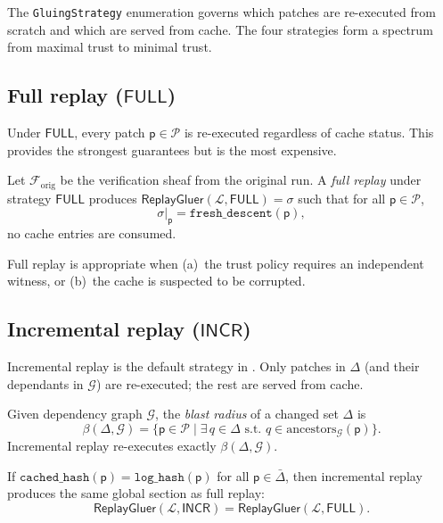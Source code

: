 \documentclass[11pt]{article}
\newcommand{\Gluer}{\mathsf{ReplayGluer}}
\newcommand{\TraceLog}{\mathcal{L}}
\newcommand{\Patch}{\mathsf{p}}
\newcommand{\PatchSet}{\mathcal{P}}
\newcommand{\GS}{\sigma}                   %
\newcommand{\ChangedSet}{\Delta}
\newcommand{\UnchangedSet}{\bar\Delta}
\newcommand{\DepGraph}{\mathcal{G}}
\newcommand{\BlastRadius}{\beta}
\newcommand{\StratFull}{\mathsf{FULL}}
\newcommand{\StratInc}{\mathsf{INCR}}
\begin{document}
The \texttt{GluingStrategy} enumeration governs which patches are
re-executed from scratch and which are served from cache.  The four
strategies form a spectrum from maximal trust to minimal trust.

\subsection{Full replay (\texorpdfstring{$\StratFull$}{FULL})}

Under $\StratFull$, every patch $\Patch \in \PatchSet$ is re-executed
regardless of cache status.  This provides the strongest guarantees but
is the most expensive.

\begin{definition}
\label{def:full-replay}
Let $\mathcal{F}_{\mathrm{orig}}$ be the verification sheaf from the
original run.  A \emph{full replay} under strategy $\StratFull$ produces
$\Gluer(\TraceLog, \StratFull) = \GS$ such that for all
$\Patch \in \PatchSet$,
\[
  \GS|_\Patch = \mathtt{fresh\_descent}(\Patch),
\]
\ie{} no cache entries are consumed.
\end{definition}

Full replay is appropriate when (a)~the trust policy requires an
independent witness, or (b)~the cache is suspected to be corrupted.

\subsection{Incremental replay (\texorpdfstring{$\StratInc$}{INCR})}

Incremental replay is the default strategy in \JuGeo.  Only patches in
$\ChangedSet$ (and their dependants in $\DepGraph$) are re-executed; the
rest are served from cache.

\begin{definition}
\label{def:blast-radius}
Given dependency graph $\DepGraph$, the \emph{blast radius} of a changed
set $\ChangedSet$ is
\[
  \BlastRadius(\ChangedSet, \DepGraph)
  = \bigl\{\Patch \in \PatchSet \;\big|\; \exists\, q \in \ChangedSet
    \text{ s.t.\ } q \in \mathrm{ancestors}_{\DepGraph}(\Patch)\bigr\}.
\]
Incremental replay re-executes exactly $\BlastRadius(\ChangedSet,
\DepGraph)$.
\end{definition}

\begin{proposition}
\label{prop:incremental-sound}
If $\mathtt{cached\_hash}(\Patch) = \mathtt{log\_hash}(\Patch)$ for all
$\Patch \in \UnchangedSet$, then incremental replay produces the same
global section as full replay:
\[
  \Gluer(\TraceLog, \StratInc) = \Gluer(\TraceLog, \StratFull).
\]
\end{proposition}
\end{document}
